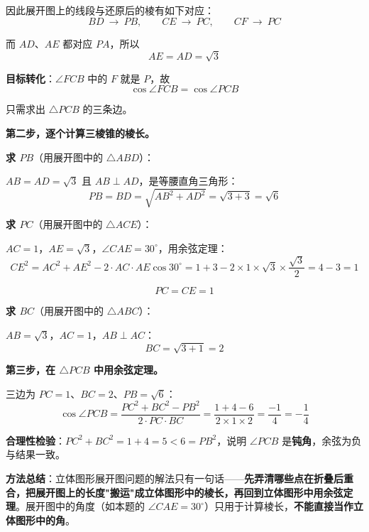 因此展开图上的线段与还原后的棱有如下对应：
\[BD\ \longrightarrow\ PB,\qquad CE\ \longrightarrow\ PC,\qquad CF\ \longrightarrow\ PC\]

而 $AD$、$AE$ 都对应 $PA$，所以
\[AE=AD=\sqrt3\]

\textbf{目标转化}：$\angle FCB$ 中的 $F$ 就是 $P$，故
\[\cos\angle FCB=\cos\angle PCB\]

只需求出 $\triangle PCB$ 的三条边。

\par\medskip

\textbf{第二步，逐个计算三棱锥的棱长。}

\textbf{求 $PB$}（用展开图中的 $\triangle ABD$）：

$AB=AD=\sqrt3$ 且 $AB\perp AD$，是等腰直角三角形：
\[PB=BD=\sqrt{AB^{2}+AD^{2}}=\sqrt{3+3}=\sqrt6\]

\textbf{求 $PC$}（用展开图中的 $\triangle ACE$）：

$AC=1$，$AE=\sqrt3$，$\angle CAE=30^\circ$，用余弦定理：
\[CE^{2}=AC^{2}+AE^{2}-2\cdot AC\cdot AE\cos30^\circ=1+3-2\times1\times\sqrt3\times\frac{\sqrt3}2=4-3=1\]

\[PC=CE=1\]

\textbf{求 $BC$}（用展开图中的 $\triangle ABC$）：

$AB=\sqrt3$，$AC=1$，$AB\perp AC$：
\[BC=\sqrt{3+1}=2\]

\par\medskip

\textbf{第三步，在 $\triangle PCB$ 中用余弦定理。}

三边为 $PC=1$、$BC=2$、$PB=\sqrt6$：
\[\cos\angle PCB=\frac{PC^{2}+BC^{2}-PB^{2}}{2\cdot PC\cdot BC}=\frac{1+4-6}{2\times1\times2}=\frac{-1}4=-\frac14\]


\begin{gktip}
\textbf{合理性检验}：$PC^{2}+BC^{2}=1+4=5<6=PB^{2}$，说明 $\angle PCB$ 是\textbf{钝角}，余弦为负  与结果一致。

\textbf{方法总结}：立体图形展开图问题的解法只有一句话——\textbf{先弄清哪些点在折叠后重合，把展开图上的长度"搬运"成立体图形中的棱长，再回到立体图形中用余弦定理}。展开图中的角度（如本题的 $\angle CAE=30^\circ$）只用于计算棱长，\textbf{不能直接当作立体图形中的角}。
\end{gktip}

\par\medskip



